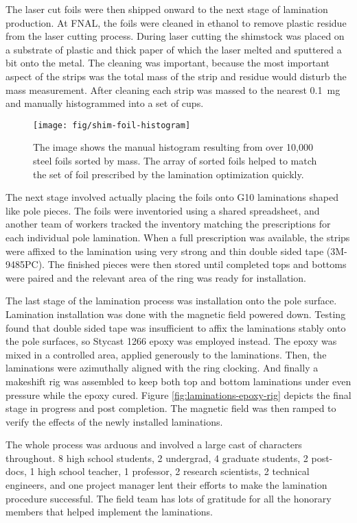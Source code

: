 The laser cut foils were then shipped onward to the next stage of lamination production.  At FNAL, the foils were cleaned in ethanol to remove plastic residue from the laser cutting process.  During laser cutting the shimstock was placed on a substrate of plastic and thick paper of which the laser melted and sputtered a bit onto the metal.  The cleaning was important, because the most important aspect of the strips was the total mass of the strip and residue would disturb the mass measurement.  After cleaning each strip was massed to the nearest \SI{0.1}{\milli\gram} and manually histogrammed into a set of cups.

\begin{figure}
\centering
\texttt{[image: fig/shim-foil-histogram]}
\caption{
    The image shows the manual histogram resulting from over 10,000 steel foils sorted by mass.  The array of sorted foils helped to match the set of foil prescribed by the lamination optimization quickly.
    \label{fig:shim-foil-histogram}
}
\end{figure}

The next stage involved actually placing the foils onto G10 laminations shaped like pole pieces.  The foils were inventoried using a shared spreadsheet, and another team of workers tracked the inventory matching the prescriptions for each individual pole lamination.  When a full prescription was available, the strips were affixed to the lamination using very strong and thin double sided tape (3M-9485PC).  The finished pieces were then stored until completed tops and bottoms were paired and the relevant area of the ring was ready for installation.

The last stage of the lamination process was installation onto the pole surface.  Lamination installation was done with the magnetic field powered down.  Testing found that double sided tape was insufficient to affix the laminations stably onto the pole surfaces, so Stycast 1266 epoxy was employed instead.  The epoxy was mixed in a controlled area, applied generously to the laminations. Then, the laminations were azimuthally aligned with the ring clocking.  And finally a makeshift rig was assembled to keep both top and bottom laminations under even pressure while the epoxy cured.  Figure \ref{fig:laminations-epoxy-rig} depicts the final stage in progress and post completion.  The magnetic field was then ramped to verify the effects of the newly installed laminations.

The whole process was arduous and involved a large cast of characters throughout.  8 high school students, 2 undergrad, 4 graduate students, 2 post-docs, 1 high school teacher, 1 professor, 2 research scientists, 2 technical engineers, and one project manager lent their efforts to make the lamination procedure successful.  The field team has lots of gratitude for all the honorary members that helped implement the laminations.

